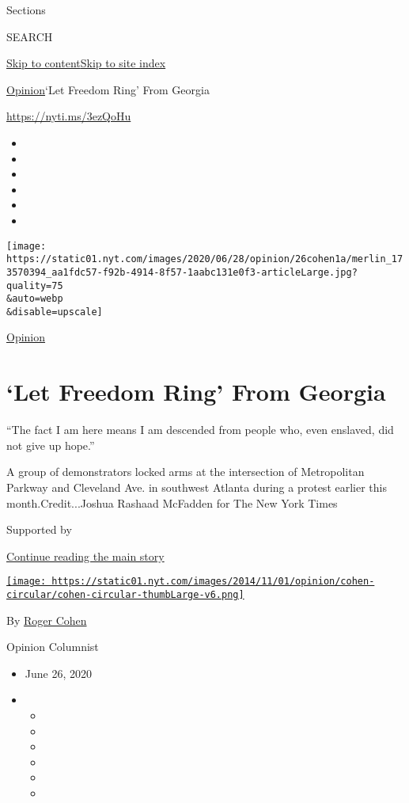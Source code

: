 Sections

SEARCH

\protect\hyperlink{site-content}{Skip to
content}\protect\hyperlink{site-index}{Skip to site index}

\href{/section/opinion}{Opinion}\textbar{}`Let Freedom Ring' From
Georgia

\href{https://nyti.ms/3ezQoHu}{https://nyti.ms/3ezQoHu}

\begin{itemize}
\item
\item
\item
\item
\item
\item
\end{itemize}

\texttt{[image: https://static01.nyt.com/images/2020/06/28/opinion/26cohen1a/merlin\_173570394\_aa1fdc57-f92b-4914-8f57-1aabc131e0f3-articleLarge.jpg?quality=75\\\&auto=webp\\\&disable=upscale]}

\href{/section/opinion}{Opinion}

\hypertarget{let-freedom-ring-from-georgia}{%
\section{`Let Freedom Ring' From
Georgia}\label{let-freedom-ring-from-georgia}}

``The fact I am here means I am descended from people who, even
enslaved, did not give up hope.''

A group of demonstrators locked arms at the intersection of Metropolitan
Parkway and Cleveland Ave. in southwest Atlanta during a protest earlier
this month.Credit...Joshua Rashaad McFadden for The New York Times

Supported by

\protect\hyperlink{after-sponsor}{Continue reading the main story}

\href{https://www.nytimes.com/by/roger-cohen}{\texttt{[image: https://static01.nyt.com/images/2014/11/01/opinion/cohen-circular/cohen-circular-thumbLarge-v6.png]}}

By \href{https://www.nytimes.com/by/roger-cohen}{Roger Cohen}

Opinion Columnist

\begin{itemize}
\item
  June 26, 2020
\item
  \begin{itemize}
  \item
  \item
  \item
  \item
  \item
  \item
  \end{itemize}
\end{itemize}

